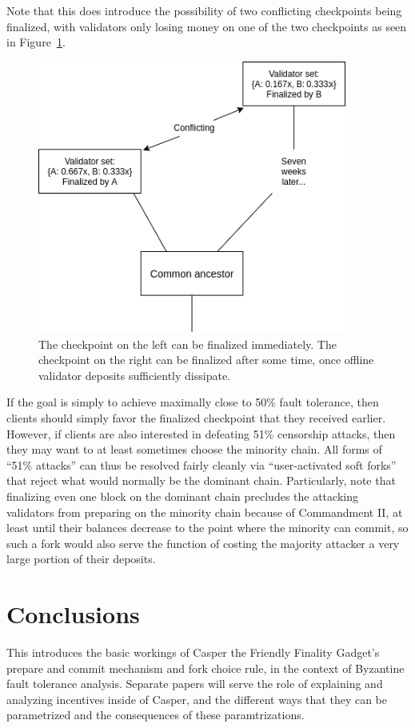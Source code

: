 \documentclass[12pt, final]{article}
\newcommand{\figref}[1]{Figure~\ref{#1}}
\begin{document}
Note that this does introduce the possibility of two conflicting checkpoints being finalized, with validators only losing money on one of the two checkpoints as seen in \figref{fig:commitsync}.

\begin{figure}[h!tb]
\centering
\includegraphics[width=4in]{CommitsSync.png}
\caption{The checkpoint on the left can be finalized immediately. The checkpoint on the right can be finalized after some time, once offline validator deposits sufficiently dissipate.}
\label{fig:commitsync}
\end{figure}

If the goal is simply to achieve maximally close to 50\% fault tolerance, then clients should simply favor the finalized checkpoint that they received earlier. However, if clients are also interested in defeating 51\% censorship attacks, then they may want to at least sometimes choose the minority chain. All forms of ``51\% attacks'' can thus be resolved fairly cleanly via ``user-activated soft forks'' that reject what would normally be the dominant chain. Particularly, note that finalizing even one block on the dominant chain precludes the attacking validators from preparing on the minority chain because of Commandment II, at least until their balances decrease to the point where the minority can commit, so such a fork would also serve the function of costing the majority attacker a very large portion of their deposits.

\section{Conclusions}

This introduces the basic workings of Casper the Friendly Finality Gadget's prepare and commit mechanism and fork choice rule, in the context of Byzantine fault tolerance analysis. Separate papers will serve the role of explaining and analyzing incentives inside of Casper, and the different ways that they can be parametrized and the consequences of these paramtrizations.
\end{document}
